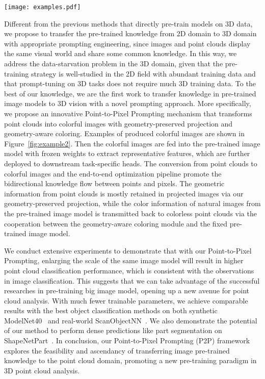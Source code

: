 \documentclass{article}
\begin{document}
\begin{figure*}[tb]
	\centering
	\texttt{[image: examples.pdf]}
	\caption{\small \textbf{Images produced by our Point-to-Pixel Prompting.} We show the original point clouds (top line) and the projected colorful images produced by our P2P of synthetic objects from ModelNet40 (left five columns) and real-world objects from ScanObjectNN (right three columns) from two different projection views.}
	\label{fig:example2}
\end{figure*}

Different from the previous methods that directly pre-train models on 3D data, we propose to transfer the pre-trained knowledge from 2D domain to 3D domain with appropriate prompting engineering, since images and point clouds display the same visual world and share some common knowledge.
In this way, we address the data-starvation problem in the 3D domain, given that the pre-training strategy is well-studied in the 2D field with abundant training data and that prompt-tuning on 3D tasks does not require much 3D training data. To the best of our knowledge, we are the first work to transfer knowledge in pre-trained image models to 3D vision with a novel prompting approach. More specifically, we propose an innovative Point-to-Pixel Prompting mechanism that transforms point clouds into colorful images with geometry-preserved projection and geometry-aware coloring. 
Examples of produced colorful images are shown in Figure~\ref{fig:example2}.
Then the colorful images are fed into the pre-trained image model with frozen weights to extract representative features, which are further deployed to downstream task-specific heads. 
The conversion from point clouds to colorful images and the end-to-end optimization pipeline promote the bidirectional knowledge flow between points and pixels. The geometric information from point clouds is mostly retained in projected images via our geometry-preserved projection, while the color information of natural images from the pre-trained image model is transmitted back to colorless point clouds via the cooperation between the geometry-aware coloring module and the fixed pre-trained image model.

We conduct extensive experiments to demonstrate that with our Point-to-Pixel Prompting, enlarging the scale of the same image model will result in higher point cloud classification performance, which is consistent with the observations in image classification. This suggests that we can take advantage of the successful researches in pre-training big image model, opening up a new avenue for point cloud analysis. With much fewer trainable parameters, we achieve comparable results with the best object classification methods on both synthetic ModelNet40~\cite{wu2015modelnet} and real-world ScanObjectNN~\cite{uy2019scanobjectnn}. We also demonstrate the potential of our method to perform dense predictions like part segmentation on ShapeNetPart~\cite{yi2016shapenetpart}. In conclusion, our Point-to-Pixel Prompting (P2P) framework explores the feasibility and ascendancy of transferring image pre-trained knowledge to the point cloud domain, promoting a new pre-training paradigm in 3D point cloud analysis.
\end{document}
